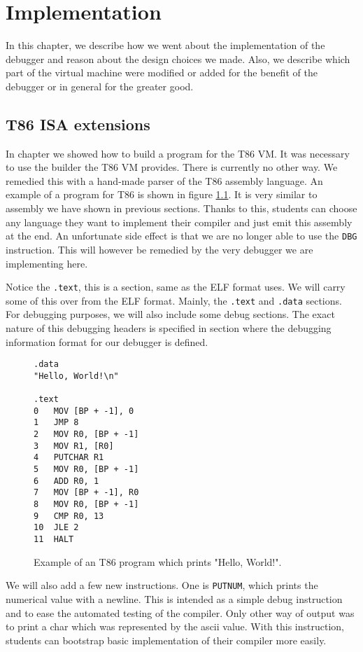 \chapter{Implementation}
In this chapter, we describe how we went about the implementation
of the debugger and reason about the design choices we made.
Also, we describe which part of the virtual machine were
modified or added for the benefit of the debugger or in
general for the greater good.

\section{T86 ISA extensions}\label{section:parser}
In chapter  we showed how to build a program for the T86 VM. It was
necessary to use the builder the T86 VM provides. There is currently no other
way. We remedied this with a hand-made parser of the T86 assembly language. An
example of a program for T86 is shown in figure \ref{fig:t86-program}. It is
very similar to assembly we have shown in previous sections. Thanks to this,
students can choose any language they want to implement their compiler and just
emit this assembly at the end. An unfortunate side effect is that we are no
longer able to use the \texttt{DBG} instruction. This will however be remedied
by the very debugger we are implementing here. 

Notice the \texttt{.text}, this is a section, same as the ELF format uses. We
will carry some of this over from the ELF format. Mainly, the \texttt{.text}
and \texttt{.data} sections. For debugging purposes, we will also include some
debug sections. The exact nature of this debugging headers is specified in
section  where the debugging information format for our debugger is
defined.

\begin{figure}
    \begin{lstlisting}
.data
"Hello, World!\n"

.text
0   MOV [BP + -1], 0
1   JMP 8
2   MOV R0, [BP + -1]
3   MOV R1, [R0]
4   PUTCHAR R1
5   MOV R0, [BP + -1]
6   ADD R0, 1
7   MOV [BP + -1], R0
8   MOV R0, [BP + -1]
9   CMP R0, 13
10  JLE 2
11  HALT
    \end{lstlisting}
    \caption{Example of an T86 program which prints "Hello, World!".}
    \label{fig:t86-program}
\end{figure}

We will also add a few new instructions. One is \texttt{PUTNUM}, which prints
the numerical value with a newline. This is intended as a simple debug instruction
and to ease the automated testing of the compiler. Only other way of output was
to print a char which was represented by the ascii value. With this instruction,
students can bootstrap basic implementation of their compiler more easily.

